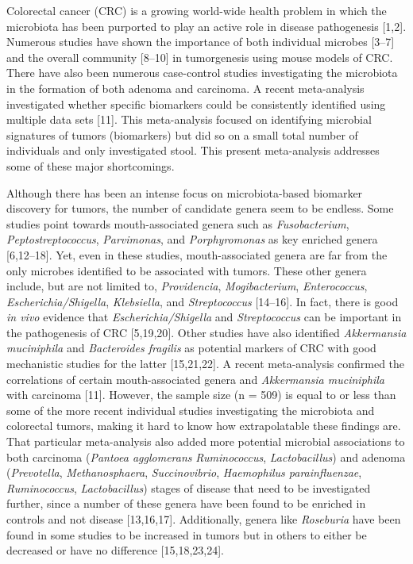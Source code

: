 \documentclass[12pt,]{article}
\begin{document}
Colorectal cancer (CRC) is a growing world-wide health problem in which
the microbiota has been purported to play an active role in disease
pathogenesis {[}1,2{]}. Numerous studies have shown the importance of
both individual microbes {[}3--7{]} and the overall community
{[}8--10{]} in tumorgenesis using mouse models of CRC. There have also
been numerous case-control studies investigating the microbiota in the
formation of both adenoma and carcinoma. A recent meta-analysis
investigated whether specific biomarkers could be consistently
identified using multiple data sets {[}11{]}. This meta-analysis focused
on identifying microbial signatures of tumors (biomarkers) but did so on
a small total number of individuals and only investigated stool. This
present meta-analysis addresses some of these major shortcomings.

Although there has been an intense focus on microbiota-based biomarker
discovery for tumors, the number of candidate genera seem to be endless.
Some studies point towards mouth-associated genera such as
\emph{Fusobacterium}, \emph{Peptostreptococcus}, \emph{Parvimonas}, and
\emph{Porphyromonas} as key enriched genera {[}6,12--18{]}. Yet, even in
these studies, mouth-associated genera are far from the only microbes
identified to be associated with tumors. These other genera include, but
are not limited to, \emph{Providencia}, \emph{Mogibacterium},
\emph{Enterococcus}, \emph{Escherichia/Shigella}, \emph{Klebsiella}, and
\emph{Streptococcus} {[}14--16{]}. In fact, there is good \emph{in vivo}
evidence that \emph{Escherichia/Shigella} and \emph{Streptococcus} can
be important in the pathogenesis of CRC {[}5,19,20{]}. Other studies
have also identified \emph{Akkermansia muciniphila} and
\emph{Bacteroides fragilis} as potential markers of CRC with good
mechanistic studies for the latter {[}15,21,22{]}. A recent
meta-analysis confirmed the correlations of certain mouth-associated
genera and \emph{Akkermansia muciniphila} with carcinoma {[}11{]}.
However, the sample size (n = 509) is equal to or less than some of the
more recent individual studies investigating the microbiota and
colorectal tumors, making it hard to know how extrapolatable these
findings are. That particular meta-analysis also added more potential
microbial associations to both carcinoma (\emph{Pantoea agglomerans}
\emph{Ruminococcus}, \emph{Lactobacillus}) and adenoma
(\emph{Prevotella}, \emph{Methanosphaera}, \emph{Succinovibrio},
\emph{Haemophilus parainfluenzae}, \emph{Ruminococcus},
\emph{Lactobacillus}) stages of disease that need to be investigated
further, since a number of these genera have been found to be enriched
in controls and not disease {[}13,16,17{]}. Additionally, genera like
\emph{Roseburia} have been found in some studies to be increased in
tumors but in others to either be decreased or have no difference
{[}15,18,23,24{]}.
\end{document}
